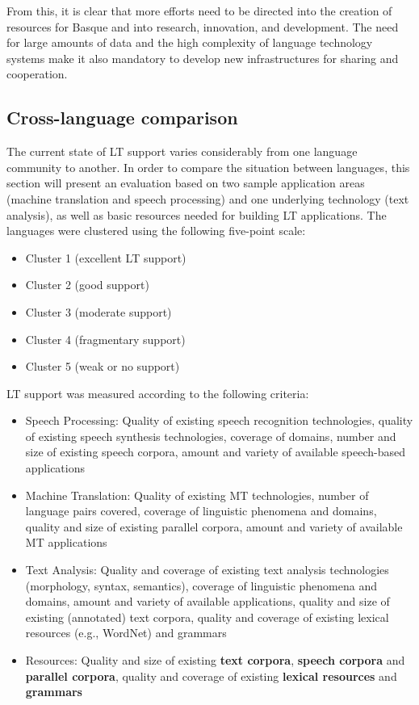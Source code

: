 \begin{multicols}{2}
\begin{itemize}
    \end{itemize}
    From this, it is clear that more efforts need to be directed into the creation of resources for Basque and into research, innovation, and development. The need for large amounts of data and the high complexity of language technology systems make it also mandatory to develop new infrastructures for sharing and cooperation.

\subsection{Cross-language comparison}

   The current state of LT support varies considerably from one language community to another. In order to compare the situation between languages, this section will present an evaluation based on two sample application areas (machine translation and speech processing) and one underlying technology (text analysis), as well as basic resources needed for building LT applications. The languages were clustered using the following five-point scale: 

    \begin{itemize}
      \item Cluster 1 (excellent LT support)
      \item Cluster 2 (good support)
      \item Cluster 3 (moderate support)
      \item Cluster 4 (fragmentary support) 
      \item Cluster 5 (weak or no support)
    \end{itemize}

LT support was measured according to the following criteria:
\begin{itemize}
\item Speech Processing: Quality of existing speech recognition technologies, quality of existing speech synthesis technologies, coverage of domains, number and size of existing speech corpora, amount and variety of available speech-based applications
\item Machine Translation: Quality of existing MT technologies, number of language pairs covered, coverage of linguistic phenomena and domains, quality and size of existing parallel corpora, amount and variety of available MT applications
\item Text Analysis: Quality and coverage of existing text analysis technologies (morphology, syntax, semantics), coverage of linguistic phenomena and domains, amount and variety of available applications, quality and size of existing (annotated) text corpora, quality and coverage of existing lexical resources (e.g., WordNet) and grammars
\item Resources: Quality and size of existing \textbf{text corpora}, \textbf{speech corpora} and \textbf{parallel corpora}, quality and coverage of existing \textbf{lexical resources} and \textbf{grammars}
\end{itemize} 


\end{multicols}
